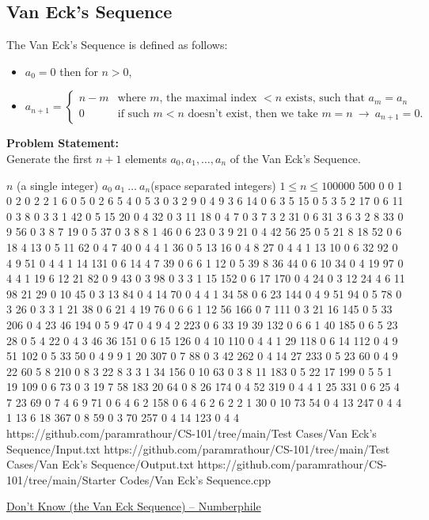 \documentclass[../../Problems]{subfiles}
\begin{document}
\subsection{Van Eck's Sequence}
The Van Eck's Sequence is defined as follows:
\begin{itemize}
	\item $a_0 = 0$ then for $n>0$,\\
	\item $a_{n+1} = \begin{cases}
		n-m & \text{where $m$, the maximal index $<n$ exists, such that $a_{m}=a_{n}$}\\
		0 & \text{if such $m<n$ doesn't exist, then we take $m=n\ \rightarrow\ a_{n+1}=0$.}
	\end{cases}$
\end{itemize}
\textbf{Problem Statement:}\\
Generate the first $n+1$ elements $a_0,a_1,\ldots,a_n$ of the Van Eck's Sequence.
\begin{testcasesMore}
	{$n$ \hfill(a single integer)}
	{$a_0\ a_1\ \ldots\ a_n$\hfill(space separated integers)}
	{$1 \leq n \leq 100000$}
	{500}
	{0 0 1 0 2 0 2 2 1 6 0 5 0 2 6 5 4 0 5 3 0 3 2 9 0 4 9 3 6 14 0 6 3 5 15 0 5 3 5 2 17 0 6 11 0 3 8 0 3 3 1 42 0 5 15 20 0 4 32 0 3 11 18 0 4 7 0 3 7 3 2 31 0 6 31 3 6 3 2 8 33 0 9 56 0 3 8 7 19 0 5 37 0 3 8 8 1 46 0 6 23 0 3 9 21 0 4 42 56 25 0 5 21 8 18 52 0 6 18 4 13 0 5 11 62 0 4 7 40 0 4 4 1 36 0 5 13 16 0 4 8 27 0 4 4 1 13 10 0 6 32 92 0 4 9 51 0 4 4 1 14 131 0 6 14 4 7 39 0 6 6 1 12 0 5 39 8 36 44 0 6 10 34 0 4 19 97 0 4 4 1 19 6 12 21 82 0 9 43 0 3 98 0 3 3 1 15 152 0 6 17 170 0 4 24 0 3 12 24 4 6 11 98 21 29 0 10 45 0 3 13 84 0 4 14 70 0 4 4 1 34 58 0 6 23 144 0 4 9 51 94 0 5 78 0 3 26 0 3 3 1 21 38 0 6 21 4 19 76 0 6 6 1 12 56 166 0 7 111 0 3 21 16 145 0 5 33 206 0 4 23 46 194 0 5 9 47 0 4 9 4 2 223 0 6 33 19 39 132 0 6 6 1 40 185 0 6 5 23 28 0 5 4 22 0 4 3 46 36 151 0 6 15 126 0 4 10 110 0 4 4 1 29 118 0 6 14 112 0 4 9 51 102 0 5 33 50 0 4 9 9 1 20 307 0 7 88 0 3 42 262 0 4 14 27 233 0 5 23 60 0 4 9 22 60 5 8 210 0 8 3 22 8 3 3 1 34 156 0 10 63 0 3 8 11 183 0 5 22 17 199 0 5 5 1 19 109 0 6 73 0 3 19 7 58 183 20 64 0 8 26 174 0 4 52 319 0 4 4 1 25 331 0 6 25 4 7 23 69 0 7 4 6 9 71 0 6 4 6 2 158 0 6 4 6 2 6 2 2 1 30 0 10 73 54 0 4 13 247 0 4 4 1 13 6 18 367 0 8 59 0 3 70 257 0 4 14 123 0 4 4}
	{https://github.com/paramrathour/CS-101/tree/main/Test Cases/Van Eck's Sequence/Input.txt}
	{https://github.com/paramrathour/CS-101/tree/main/Test Cases/Van Eck's Sequence/Output.txt}
	{https://github.com/paramrathour/CS-101/tree/main/Starter Codes/Van Eck's Sequence.cpp}
\end{testcasesMore}
\begin{funvideo}
	\href{https://youtu.be/etMJxB-igrc}{Don't Know (the Van Eck Sequence) -- Numberphile}
\end{funvideo}
\end{document}
